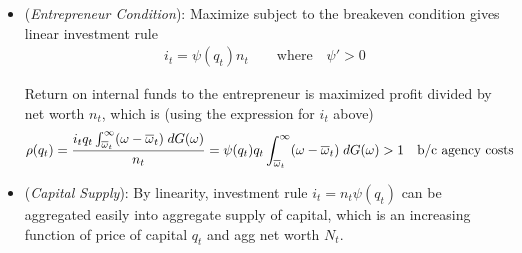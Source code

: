 \documentclass[12pt]{article}
\theoremstyle{plain}
\theoremstyle{definition}
\theoremstyle{remark}
\begin{document}
\begin{itemize}
  \item
    (\emph{Entrepreneur Condition}):
    Maximize subject to the breakeven condition gives linear investment
    rule
    \begin{align*}
      i_t=\psi(q_t)n_t
      \qquad\text{where}\quad
      \psi'>0
    \end{align*}
    \begin{comment}
    If the objective function is positive, then the investor wants to
    borrow as much as possible. That means the breakeven constraint of
    the lender entirely pins down investment $i_t$
    \begin{align*}
      i_t-n_t
      &=
      i_tq_t
      \bigg[
      \int_0^{\overline{\omega}_t}
      (\omega-\mu)\;dG(\omega)
      +
      \overline{\omega}_t\big(1-G(\overline{\omega}_t))
      \bigg]
      \\
      i_t
      &=
      n_t
      \underbrace{%
        \left(
        1-
        q_t
        \bigg[
        \int_0^{\overline{\omega}_t}
        (\omega-\mu)\;dG(\omega)
        +
        \overline{\omega}_t\big(1-G(\overline{\omega}_t))
        \bigg]
        \right)^{-1}
      }_{\psi(q_t)}
    \end{align*}
    Hence borrowing is linear in net worth, and in particular, they just
    lever up their net worth.
    Leverage $\psi(q_t)$ is increasing in $q_t$.
    So borrowing increasing in net worth $n_t$ and price of capital $q_t$,
    and then so is investment.
    \end{comment}
    Return on internal funds to the entrepreneur is maximized profit
    divided by net worth $n_t$, which is (using the expression for $i_t$
    above)
    \begin{align*}
      \rho(q_t)
      &=
      \frac{%
        i_tq_t
        \int_{\overline{\omega}_t}^\infty
        (\omega-\overline{\omega}_t)\;dG(\omega)
      }{n_t}
      =
      \psi(q_t)
      q_t
      \int_{\overline{\omega}_t}^\infty
      (\omega-\overline{\omega}_t)\;dG(\omega)
      >1
      \quad\text{b/c agency costs}
    \end{align*}

  \item
    (\emph{Capital Supply}):
    By linearity, investment rule $i_t=n_t\psi(q_t)$ can be aggregated
    easily into aggregate supply of capital, which is an increasing
    function of price of capital $q_t$ and agg net worth $N_t$.


\end{itemize}
\end{document}
